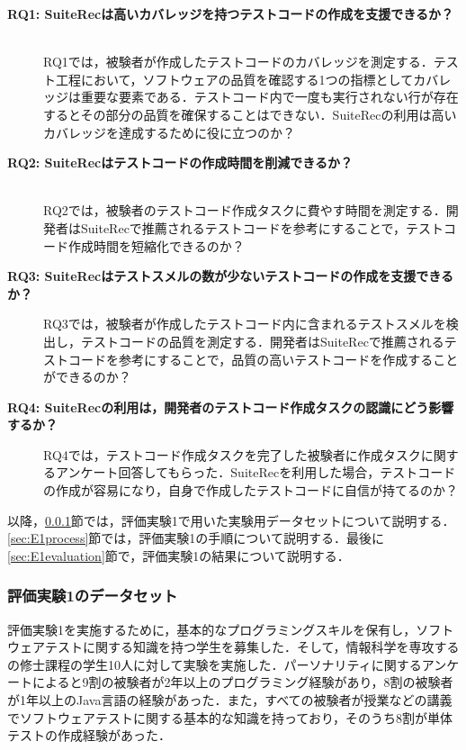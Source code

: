\documentclass[12pt]{jarticle} %
\begin{document}
\begin{description}
\item[\textbf{RQ1: {\sf SuiteRec}は高いカバレッジを持つテストコードの作成を支援できるか？}]~\\
RQ1では，被験者が作成したテストコードのカバレッジを測定する．テスト工程において，ソフトウェアの品質を確認する1つの指標としてカバレッジは重要な要素である．テストコード内で一度も実行されない行が存在するとその部分の品質を確保することはできない．{\sf SuiteRec}の利用は高いカバレッジを達成するために役に立つのか？
\item[\textbf{RQ2: {\sf SuiteRec}はテストコードの作成時間を削減できるか？}]~\\
RQ2では，被験者のテストコード作成タスクに費やす時間を測定する．開発者は{\sf SuiteRec}で推薦されるテストコードを参考にすることで，テストコード作成時間を短縮化できるのか？
\item[\textbf{RQ3: {\sf SuiteRec}はテストスメルの数が少ないテストコードの作成を支援できるか？}]
RQ3では，被験者が作成したテストコード内に含まれるテストスメルを検出し，テストコードの品質を測定する．開発者は{\sf SuiteRec}で推薦されるテストコードを参考にすることで，品質の高いテストコードを作成することができるのか？
\item[\textbf{RQ4: {\sf SuiteRec}の利用は，開発者のテストコード作成タスクの認識にどう影響するか？}]
RQ4では，テストコード作成タスクを完了した被験者に作成タスクに関するアンケート回答してもらった．{\sf SuiteRec}を利用した場合，テストコードの作成が容易になり，自身で作成したテストコードに自信が持てるのか？
\end{description}

以降，\ref{sec:E1data}節では，評価実験1で用いた実験用データセットについて説明する．\ref{sec:E1process}節では，評価実験1の手順について説明する．最後に\ref{sec:E1evaluation}節で，評価実験1の結果について説明する．


\subsubsection{評価実験1のデータセット}
\label{sec:E1data}

評価実験1を実施するために，基本的なプログラミングスキルを保有し，ソフトウェアテストに関する知識を持つ学生を募集した．そして，情報科学を専攻するの修士課程の学生10人に対して実験を実施した．パーソナリティに関するアンケートによると9割の被験者が2年以上のプログラミング経験があり，8割の被験者が1年以上のJava言語の経験があった．また，すべての被験者が授業などの講義でソフトウェアテストに関する基本的な知識を持っており，そのうち8割が単体テストの作成経験があった．
\end{document}
